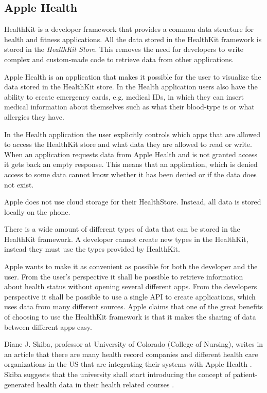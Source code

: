 \documentclass{cslthse-msc}
\begin{document}
\subsection{Apple Health}

HealthKit is a developer framework that provides a common data structure for health and fitness applications. All the data stored in the HealthKit framework is stored in the \emph{HealthKit Store}. This removes the need for developers to write complex and custom-made code to retrieve data from other applications. \cite{AppleHealthKitFramework}

Apple Health is an application that makes it possible for the user to visualize the data stored in the HealthKit store. In the Health application users also have the ability to create emergency cards, e.g. medical IDs, in which they can insert medical information about themselves such as what their blood-type is or what allergies they have.

In the Health application the user explicitly controls which apps that are allowed to access the HealthKit store and what data they are allowed to read or write. When an application requests data from Apple Health and is not granted access it gets back an empty response. This means that an application, which is denied access to some data cannot know whether it has been denied or if the data does not exist.

Apple does not use cloud storage for their HealthStore. Instead, all data is stored locally on the phone. 

There is a wide amount of different types of data that can be stored in the HealthKit framework. A developer cannot create new types in the HealthKit, instead they must use the types provided by HealthKit. 

Apple wants to make it as convenient as possible for both the developer and the user. From the user's perspective it shall be possible to retrieve information about health status without opening several different apps. From the developers perspective it shall be possible to use a single API to create applications, which uses data from many different sources. Apple claims that one of the great benefits of choosing to use the HealthKit framework is that it makes the sharing of data between different apps easy.

Diane J. Skiba, professor at University of Colorado (College of Nursing), writes in an article that there are many health record companies and different health care organizations in the US that are integrating their systems with Apple Health \cite{skiba2014connected}. Skiba suggests that the university shall start introducing the concept of patient-generated health data in their health related courses \cite{skiba2014connected}. 
\end{document}
